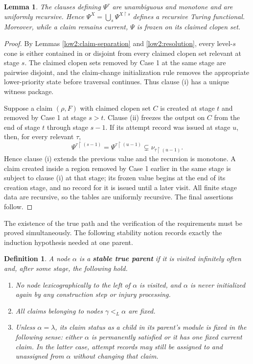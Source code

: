 \documentclass[11pt]{amsart}
\newtheorem{lemma}[theorem]{Lemma}
\newtheorem{definition}[theorem]{Definition}
\begin{document}
\begin{lemma}\label{low2:functional}
The clauses defining $\Psi^\tau$ are unambiguous and monotone and are
uniformly recursive. Hence
$\Psi^X=\bigcup_s\Psi^{X\upharpoonright s}$ defines a recursive Turing
functional. Moreover, while a claim remains current, $\Psi$ is frozen on its
claimed clopen set.
\end{lemma}

\begin{proof}
By Lemmas \ref{low2:claim-separation} and \ref{low2:resolution}, every
level-$s$ cone is either contained in or disjoint from every claimed clopen
set relevant at stage $s$. The claimed clopen sets removed by Case 1 at the
same stage are pairwise disjoint, and the claim-change initialization rule
removes the appropriate lower-priority state before traversal continues.
Thus clause (i) has a unique witness package.

Suppose a claim $(\rho,F)$ with claimed clopen set $C$ is created at stage
$t$ and removed by Case 1 at stage $s>t$. Clause (ii) freezes the output on
$C$ from the end of stage $t$ through stage $s-1$. If its attempt record was
issued at stage $u$, then, for every relevant $\tau$,
\[
        \Psi^{\tau\upharpoonright(s-1)}
        =\Psi^{\tau\upharpoonright(u-1)}
        \subsetneq \nu_{\tau\upharpoonright(u-1)}.
\]
Hence clause (i) extends the previous value and the recursion is monotone. A
claim created inside a region removed by Case 1 earlier in the same stage is
subject to clause (i) at that stage; its frozen value begins at the end of its
creation stage, and no record for it is issued until a later visit. All finite
stage data are recursive, so the tables are uniformly recursive. The final
assertions follow.
\end{proof}



The existence of the true path and the verification of the requirements must
be proved simultaneously. The following stability notion records exactly the
induction hypothesis needed at one parent.

\begin{definition}\label{low2:stable-true-parent}
A node $\alpha$ is a \textbf{stable true parent} if it is visited infinitely
often and, after some stage, the following hold.
\begin{enumerate}[label=(\alph*)]
\item No node lexicographically to the left of $\alpha$ is visited, and
      $\alpha$ is never initialized again by any construction step or injury
      processing.
\item All claims belonging to nodes $\gamma<_L\alpha$ are fixed.
\item Unless $\alpha=\lambda$, its claim status as a child in its parent's
      module is fixed in the following sense: either $\alpha$ is permanently
      satisfied or it has one fixed current claim. In the latter case,
      attempt records may still be assigned to and unassigned from $\alpha$
      without changing that claim.
\end{enumerate}
\end{definition}
\end{document}
